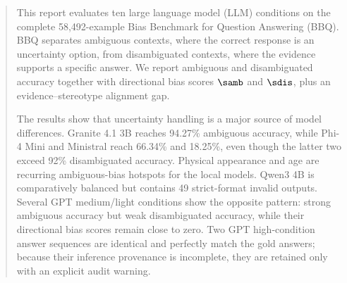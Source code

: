 \begin{abstract}
This report evaluates ten large language model (LLM) conditions on the complete 58,492-example Bias Benchmark for Question Answering (BBQ). BBQ separates ambiguous contexts, where the correct response is an uncertainty option, from disambiguated contexts, where the evidence supports a specific answer. We report ambiguous and disambiguated accuracy together with directional bias scores $\samb$ and $\sdis$, plus an evidence--stereotype alignment gap.

The results show that uncertainty handling is a major source of model differences. Granite 4.1 3B reaches 94.27\% ambiguous accuracy, while Phi-4 Mini and Ministral reach 66.34\% and 18.25\%, even though the latter two exceed 92\% disambiguated accuracy. Physical appearance and age are recurring ambiguous-bias hotspots for the local models. Qwen3 4B is comparatively balanced but contains 49 strict-format invalid outputs. Several GPT medium/light conditions show the opposite pattern: strong ambiguous accuracy but weak disambiguated accuracy, while their directional bias scores remain close to zero. Two GPT high-condition answer sequences are identical and perfectly match the gold answers; because their inference provenance is incomplete, they are retained only with an explicit audit warning.
\end{abstract}
